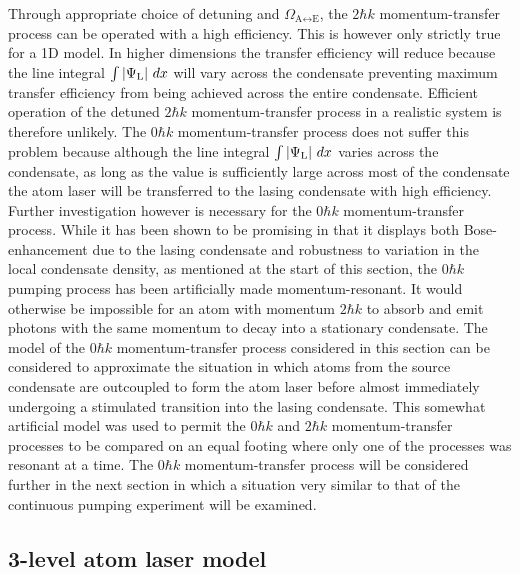 Through appropriate choice of detuning and $\Omega_{\text{A} \leftrightarrow \text{E}}$, the $2 \hbar k$ momentum-transfer process can be operated with a high efficiency.  This is however only strictly true for a 1D model.  In higher dimensions the transfer efficiency will reduce because the line integral $\int \left|\Psi_\text{L}\right|\, dx$ will vary across the condensate preventing maximum transfer efficiency from being achieved across the entire condensate.  Efficient operation of the detuned $2 \hbar k$ momentum-transfer process in a realistic system is therefore unlikely.  The $0 \hbar k$ momentum-transfer process does not suffer this problem because although the line integral $\int \left|\Psi_\text{L}\right|\, dx$ varies across the condensate, as long as the value is sufficiently large across most of the condensate the atom laser will be transferred to the lasing condensate with high efficiency.  Further investigation however is necessary for the $0 \hbar k$ momentum-transfer process.  While it has been shown to be promising in that it displays both Bose-enhancement due to the lasing condensate and robustness to variation in the local condensate density, as mentioned at the start of this section, the $0 \hbar k$ pumping process has been artificially made momentum-resonant.  It would otherwise be impossible for an atom with momentum $2 \hbar k$ to absorb and emit photons with the same momentum to decay into a stationary condensate.  The model of the $0 \hbar k$ momentum-transfer process considered in this section can be considered to approximate the situation in which atoms from the source condensate are outcoupled to form the atom laser before almost immediately undergoing a stimulated transition into the lasing condensate.  This somewhat artificial model was used to permit the $0 \hbar k$ and $2\hbar k$ momentum-transfer processes to be compared on an equal footing where only one of the processes was resonant at a time.  The $0 \hbar k$ momentum-transfer process will be considered further in the next section in which a situation very similar to that of the continuous pumping experiment will be examined.

\subsection{3-level atom laser model}
\label{OpticalPumping:3LevelModel}

